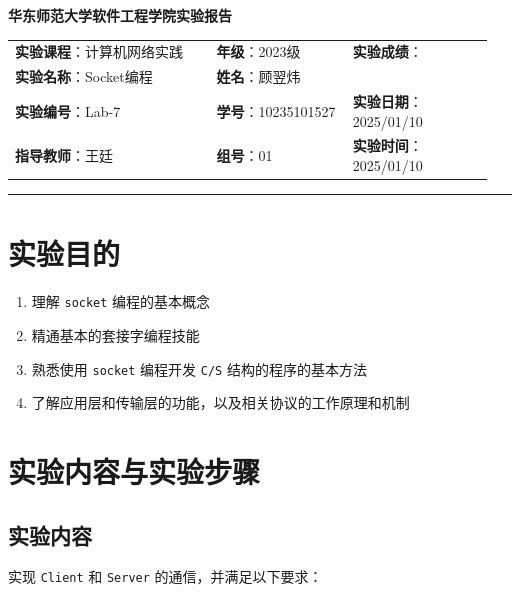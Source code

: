 \documentclass{article}
\begin{document}
	\begin{center}
		{\Large{\textbf{\heiti 华东师范大学软件工程学院实验报告}}}
		\begin{table}[htb]
			\flushleft
			\begin{tabular}{p{0.4\linewidth}p{0.27\linewidth}p{0.28\linewidth}}\\
				\textbf{实验课程}：计算机网络实践  & \textbf{年级}：2023级       & \textbf{实验成绩}：  \\
				\textbf{实验名称}：Socket编程 & \textbf{姓名}：顾翌炜         &                 \\
				\textbf{实验编号}：Lab-7     & \textbf{学号}：10235101527 & \textbf{实验日期}：2025/01/10  \\
				\textbf{指导教师}：王廷     & \textbf{组号}：01            & \textbf{实验时间}：2025/01/10  \\ 
			\end{tabular}
		\end{table}
	\end{center}
	\rule{\textwidth}{2pt}
	
	\tableofcontents
	
	\clearpage
	
	\section{实验目的}
	
	\begin{enumerate}[noitemsep, label={{\arabic*})}]
		\item 理解 \texttt{socket} 编程的基本概念
		\item 精通基本的套接字编程技能
		\item 熟悉使用 \texttt{socket} 编程开发 \texttt{C/S} 结构的程序的基本方法
		\item 了解应用层和传输层的功能，以及相关协议的工作原理和机制
	\end{enumerate}
	
	
	\section{实验内容与实验步骤}
	
	\subsection{实验内容}
	
	实现 \texttt{Client} 和 \texttt{Server} 的通信，并满足以下要求：
	
\end{document}
